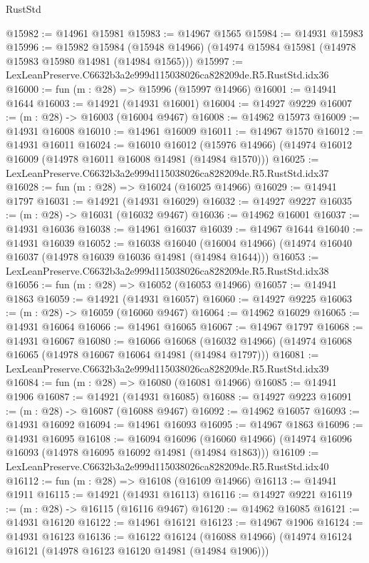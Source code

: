 \begin{lexlean}{RustStd}
\begin{coremodule}
@15982 := @14961 @15981
@15983 := @14967 @1565
@15984 := @14931 @15983
@15996 := @15982
    @15984
    (@15948 @14966)
    (@14974 @15984 @15981 (@14978 @15983 @15980 @14981 (@14984 @1565)))
@15997 := LexLeanPreserve.C6632b3a2e999d115038026ca828209de.R5.RustStd.idx36
@16000 := fun (m : @28) => @15996 (@15997 @14966)
@16001 := @14941 @1644
@16003 := @14921 (@14931 @16001)
@16004 := @14927 @9229
@16007 := (m : @28) -> @16003 (@16004 @9467)
@16008 := @14962 @15973
@16009 := @14931 @16008
@16010 := @14961 @16009
@16011 := @14967 @1570
@16012 := @14931 @16011
@16024 := @16010
    @16012
    (@15976 @14966)
    (@14974 @16012 @16009 (@14978 @16011 @16008 @14981 (@14984 @1570)))
@16025 := LexLeanPreserve.C6632b3a2e999d115038026ca828209de.R5.RustStd.idx37
@16028 := fun (m : @28) => @16024 (@16025 @14966)
@16029 := @14941 @1797
@16031 := @14921 (@14931 @16029)
@16032 := @14927 @9227
@16035 := (m : @28) -> @16031 (@16032 @9467)
@16036 := @14962 @16001
@16037 := @14931 @16036
@16038 := @14961 @16037
@16039 := @14967 @1644
@16040 := @14931 @16039
@16052 := @16038
    @16040
    (@16004 @14966)
    (@14974 @16040 @16037 (@14978 @16039 @16036 @14981 (@14984 @1644)))
@16053 := LexLeanPreserve.C6632b3a2e999d115038026ca828209de.R5.RustStd.idx38
@16056 := fun (m : @28) => @16052 (@16053 @14966)
@16057 := @14941 @1863
@16059 := @14921 (@14931 @16057)
@16060 := @14927 @9225
@16063 := (m : @28) -> @16059 (@16060 @9467)
@16064 := @14962 @16029
@16065 := @14931 @16064
@16066 := @14961 @16065
@16067 := @14967 @1797
@16068 := @14931 @16067
@16080 := @16066
    @16068
    (@16032 @14966)
    (@14974 @16068 @16065 (@14978 @16067 @16064 @14981 (@14984 @1797)))
@16081 := LexLeanPreserve.C6632b3a2e999d115038026ca828209de.R5.RustStd.idx39
@16084 := fun (m : @28) => @16080 (@16081 @14966)
@16085 := @14941 @1906
@16087 := @14921 (@14931 @16085)
@16088 := @14927 @9223
@16091 := (m : @28) -> @16087 (@16088 @9467)
@16092 := @14962 @16057
@16093 := @14931 @16092
@16094 := @14961 @16093
@16095 := @14967 @1863
@16096 := @14931 @16095
@16108 := @16094
    @16096
    (@16060 @14966)
    (@14974 @16096 @16093 (@14978 @16095 @16092 @14981 (@14984 @1863)))
@16109 := LexLeanPreserve.C6632b3a2e999d115038026ca828209de.R5.RustStd.idx40
@16112 := fun (m : @28) => @16108 (@16109 @14966)
@16113 := @14941 @1911
@16115 := @14921 (@14931 @16113)
@16116 := @14927 @9221
@16119 := (m : @28) -> @16115 (@16116 @9467)
@16120 := @14962 @16085
@16121 := @14931 @16120
@16122 := @14961 @16121
@16123 := @14967 @1906
@16124 := @14931 @16123
@16136 := @16122
    @16124
    (@16088 @14966)
    (@14974 @16124 @16121 (@14978 @16123 @16120 @14981 (@14984 @1906)))

\end{coremodule}
\end{lexlean}
